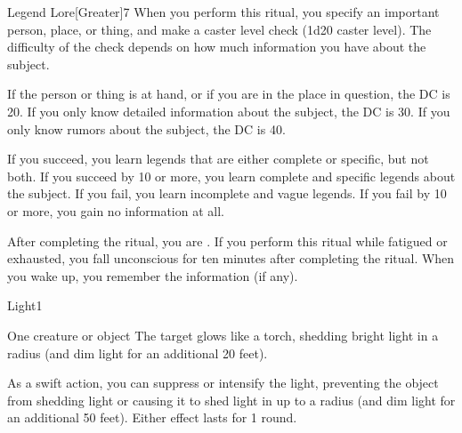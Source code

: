 \begin{spellsection}{Legend Lore}[Greater]{7}
\spellline
\spelleffect When you perform this ritual, you specify an important person, place, or thing, and make a caster level check (1d20 \add caster level). The difficulty of the check depends on how much information you have about the subject.

If the person or thing is at hand, or if you are in the place in question, the DC is 20. If you only know detailed information about the subject, the DC is 30. If you only know rumors about the subject, the DC is 40.

If you succeed, you learn legends that are either complete or specific, but not both. If you succeed by 10 or more, you learn complete and specific legends about the subject.  If you fail, you learn incomplete and vague legends. If you fail by 10 or more, you gain no information at all.

After completing the ritual, you are \exhausted. If you perform this ritual while fatigued or exhausted, you fall unconscious for ten minutes after completing the ritual. When you wake up, you remember the information (if any).
\end{spellsection}

\begin{spellsection}{Light}{1}
\spellrng{\rngtouch}
\spelldur \durlong \dismissable
{}
\begin{spelltarget}{One creature or object}
    \spelleffect The target glows like a torch, shedding bright light in a \areamed radius (and dim light for an additional 20 feet).

    As a swift action, you can suppress or intensify the light, preventing the object from shedding light or causing it to shed light in up to a \arealarge radius (and dim light for an additional 50 feet). Either effect lasts for 1 round.
\end{spelltarget}
\end{spellsection}

